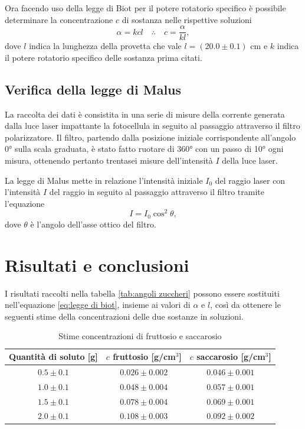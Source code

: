 \documentclass{article}
\begin{document}
Ora facendo uso della legge di Biot per il potere rotatorio specifico è possibile determinare la concentrazione $c$ di sostanza nelle rispettive soluzioni
\begin{equation}
    \label{eq:legge di biot}
    \alpha=kcl\quad\therefore\quad c=\frac{\alpha}{kl},
\end{equation}
dove $l$ indica la lunghezza della provetta che vale $l=(20.0\pm0.1)$ cm e $k$ indica il potere rotatorio specifico delle sostanza prima citati.
\subsection{Verifica della legge di Malus}
La raccolta dei dati è consistita in una serie di misure della corrente generata dalla luce laser impattante la fotocellula in seguito al passaggio attraverso il filtro polarizzatore. Il filtro, partendo dalla posizione iniziale corrispondente all'angolo 0° sulla scala graduata, è stato fatto ruotare di 360° con un passo di 10° ogni misura, ottenendo pertanto trentasei misure dell'intensità $I$ della luce laser. 

La legge di Malus mette in relazione l'intensità iniziale $I_0$ del raggio laser con l'intensità $I$ del raggio in seguito al passaggio attraverso il filtro tramite l'equazione
\begin{equation}
    \label{eq:legge di malus}
    I=I_0\cos^2{\theta},
\end{equation}
dove $\theta$ è l'angolo dell'asse ottico del filtro.

\section{Risultati e conclusioni}
I risultati raccolti nella tabella \ref{tab:angoli zuccheri} possono essere sostituiti nell'equazione \eqref{eq:legge di biot}, insieme ai valori di $\alpha$ e $l$, così da ottenere le seguenti stime della concentrazioni delle due sostanze in soluzioni.
\begin{table}[h]
    \centering
    \begin{tabular}{|c|c|c|}
        \hline
        \textbf{Quantità di soluto [g]} & \textbf{$c$ fruttosio [g/cm$^3$]} & \textbf{$c$ saccarosio [g/cm$^3$]} \\
        \hline
        $0.5 \pm 0.1$ & $0.026\pm0.002$ & $0.046\pm0.001$ \\
        \hline
        $1.0 \pm 0.1$ & $0.048\pm0.004$ & $0.057\pm0.001$ \\
        \hline
        $1.5 \pm 0.1$ & $0.078\pm0.004$ & $0.069\pm0.001$ \\
        \hline
        $2.0 \pm 0.1$ & $0.108\pm0.003$ & $0.092\pm0.002$ \\
        \hline
    \end{tabular}
    \caption{Stime concentrazioni di fruttosio e saccarosio}
    \label{tab:concentrazioni zuccheri}
\end{table}
\end{document}
